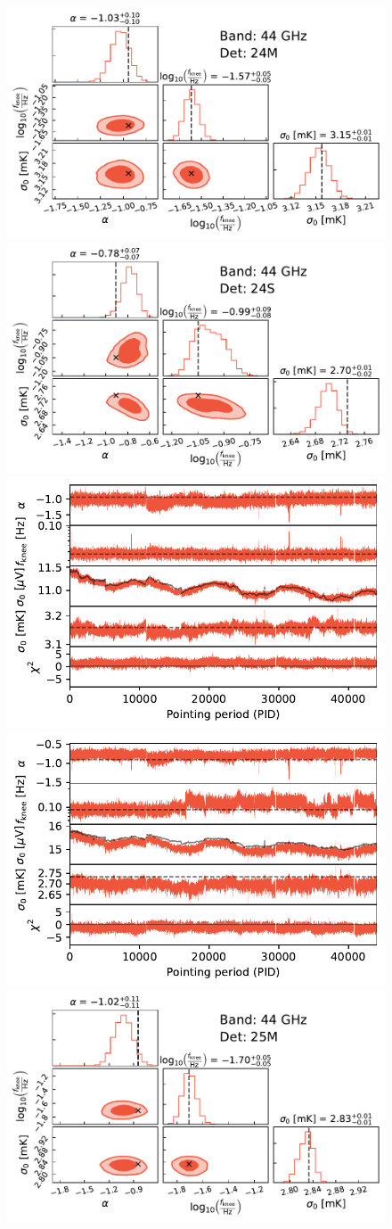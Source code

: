 \documentclass[twocolumn]{aa}
\begin{document}
\begin{figure}[p]
	\begin{center}
		\includegraphics[width=0.495\linewidth]{figs/corner_band_044_det_1_mean.pdf}
		\includegraphics[width=0.495\linewidth]{figs/corner_band_044_det_2_mean.pdf}\\
		\includegraphics[width=0.495\linewidth]{figs/xi_vs_pid_band_044_det_1_mean.pdf}
		\includegraphics[width=0.495\linewidth]{figs/xi_vs_pid_band_044_det_2_mean.pdf}\\
		\vspace*{0.5mm}
		\includegraphics[width=0.495\linewidth]{figs/corner_band_044_det_3_mean.pdf}

\end{center}
\end{figure}
\end{document}
